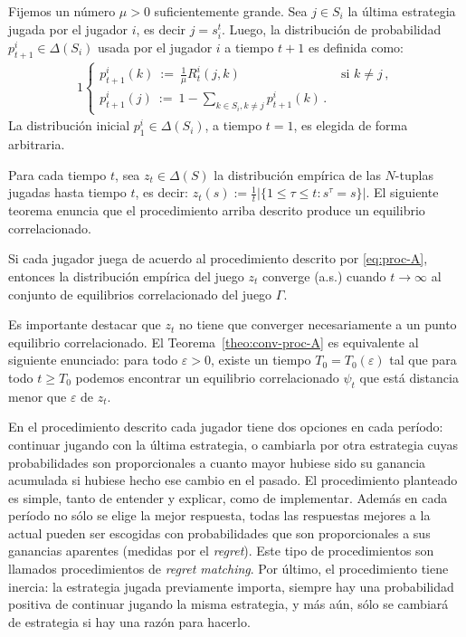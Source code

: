 Fijemos un número $\mu > 0$ suficientemente grande. Sea $j \in S_i$ la última estrategia jugada por el jugador $i$, es decir $j = s_i^t$. Luego, la distribución de probabilidad $p_{t+1}^i \in \Delta(S_i)$ usada por el jugador $i$ a tiempo $t+1$ es definida como:
\begin{alignat}{1}
\label{eq:proc-A}
  \begin{cases}
    p_{t+1}^i(k)\ :=\  \frac{1}{\mu} R_t^i(j, k) & \text{ si } k \neq j \,, \\
    p_{t+1}^i(j)\ :=\ 1 - \sum_{k \in S_i, k \neq j} p_{t+1}^i(k) \,.
  \end{cases}
\end{alignat}
La distribución inicial $p_{1}^i \in \Delta(S_i)$, a tiempo $t=1$, es elegida de forma arbitraria.

Para cada tiempo $t$, sea $z_t \in \Delta(S)$ la distribución empírica de las $N$-tuplas jugadas hasta tiempo $t$, es decir:
$z_t(s) := \frac{1}{t} |\{1\leq\tau \leq t : s^{\tau} = s \}|$. El siguiente teorema enuncia que el procedimiento arriba descrito produce un equilibrio correlacionado.

\begin{theorem}
\label{theo:conv-proc-A}
Si cada jugador juega de acuerdo al procedimiento descrito por \eqref{eq:proc-A}, entonces la distribución empírica del juego $z_t$ converge (a.s.) cuando $t \rightarrow \infty$ al conjunto de equilibrios correlacionado del juego $\Gamma$.
\end{theorem}

Es importante destacar que $z_t$ no tiene que converger necesariamente a un punto equilibrio correlacionado. El Teorema~\ref{theo:conv-proc-A} es equivalente al siguiente enunciado: para todo $\varepsilon > 0$, existe un tiempo $T_0 = T_0(\varepsilon)$ tal que para todo $t \geq T_0$ podemos encontrar un equilibrio correlacionado $\psi_t$ que está distancia menor que $\varepsilon$ de $z_t$.

En el procedimiento descrito cada jugador tiene dos opciones en cada período: continuar jugando con la última estrategia, o cambiarla por otra estrategia cuyas probabilidades son proporcionales a cuanto mayor hubiese sido su ganancia acumulada si hubiese hecho ese cambio en el pasado. El procedimiento planteado es simple, tanto de entender y explicar, como de implementar. Además en cada período no sólo se elige la mejor respuesta, todas las respuestas mejores a la actual pueden ser escogidas con probabilidades que son proporcionales a sus ganancias aparentes (medidas por el \textit{regret}). Este tipo de procedimientos son llamados procedimientos de \textit{regret matching}. Por último, el procedimiento tiene inercia: la estrategia jugada previamente importa, siempre hay una probabilidad positiva de continuar jugando la misma estrategia, y más aún, sólo se cambiará de estrategia si hay una razón para hacerlo.

